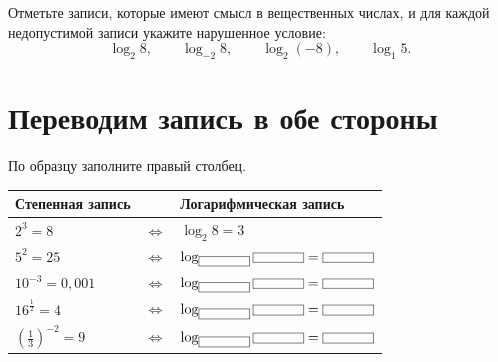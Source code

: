 \begin{checkpointbox}
  Отметьте записи, которые имеют смысл в вещественных числах, и для
  каждой недопустимой записи укажите нарушенное условие:
  \[
    \log_2 8,
    \qquad
    \log_{-2}8,
    \qquad
    \log_2(-8),
    \qquad
    \log_1 5.
  \]
\end{checkpointbox}

\section{Переводим запись в обе стороны}

\begin{fillbox}
  По образцу заполните правый столбец.

  \begin{center}
    \renewcommand{\arraystretch}{1.48}
    \begin{tabularx}{\textwidth}{
      >{\centering\arraybackslash}p{}
      >{\centering\arraybackslash}p{}
      >{\centering\arraybackslash}X}
      \toprule
      \rowcolor{TableHeader}
      Степенная запись & & Логарифмическая запись \\
      \midrule
      \(2^3=8\) & \(\Longleftrightarrow\) & \(\log_2 8=3\) \\
      \(5^2=25\) & \(\Longleftrightarrow\) & \(\log_{\mathgap[12mm]}\mathgap[12mm]=\mathgap[12mm]\) \\
      \(10^{-3}=0{,}001\) & \(\Longleftrightarrow\) & \(\log_{\mathgap[12mm]}\mathgap[12mm]=\mathgap[12mm]\) \\
      \(16^{\frac12}=4\) & \(\Longleftrightarrow\) & \(\log_{\mathgap[12mm]}\mathgap[12mm]=\mathgap[12mm]\) \\
      \(\left(\frac13\right)^{-2}=9\) & \(\Longleftrightarrow\) & \(\log_{\mathgap[12mm]}\mathgap[12mm]=\mathgap[12mm]\) \\
      \bottomrule
    \end{tabularx}
  \end{center}
\end{fillbox}

